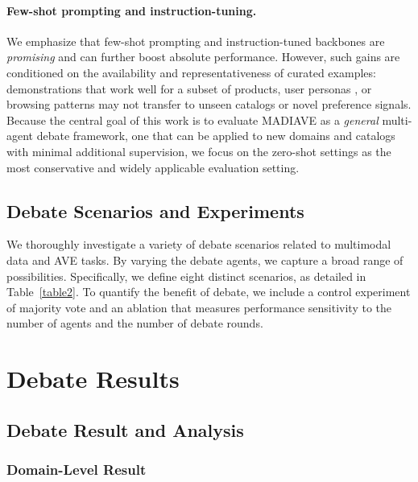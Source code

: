 \documentclass[11pt]{article}
\newcommand{\modelname}{MADIAVE}
\begin{document}
\paragraph{Few-shot prompting and instruction-tuning.}
We emphasize that few-shot prompting and instruction-tuned backbones are \emph{promising} and can further boost absolute performance. However, such gains are conditioned on the availability and representativeness of curated examples: demonstrations that work well for a subset of products, user personas \citep{wu2025psg}, or browsing patterns may not transfer to unseen catalogs or novel preference signals. Because the central goal of this work is to evaluate \textsc{\modelname} as a \emph{general} multi-agent debate framework, one that can be applied to new domains and catalogs with minimal additional supervision, we focus on the zero-shot settings as the most conservative and widely applicable evaluation setting.

\subsection{Debate Scenarios and Experiments}
\label{sec:Debate Scenarios}
We thoroughly investigate a variety of debate scenarios related to multimodal data and AVE tasks. By varying the debate agents, we capture a broad range of possibilities. Specifically, we define eight distinct scenarios, as detailed in Table~\ref{table2}. To quantify the benefit of debate, we include a control experiment of majority vote and an ablation that measures performance sensitivity to the number of agents and the number of debate rounds.

\section{Debate Results}
\label{sec:Debate Results}

\subsection{Debate Result and Analysis}

\subsubsection{Domain-Level Result}
\end{document}
